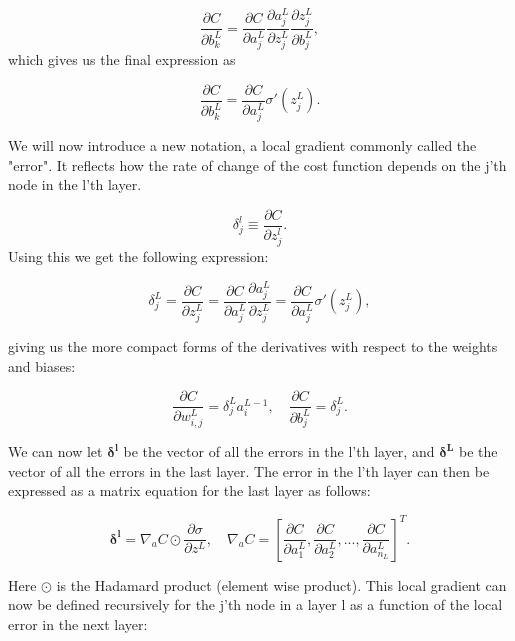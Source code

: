 \begin{equation*}
    \frac{\partial C}{\partial b_k^L} = \frac{\partial C}{\partial a_j^L}\frac{\partial a_j^L}{\partial z_j^L}\frac{\partial z_j^L}{\partial b_{j}^L},
\end{equation*}
which gives us the final expression as 

\begin{equation*}
    \frac{\partial C}{\partial b_k^L} = \frac{\partial C}{\partial a_j^L}\sigma'(z_j^L). 
\end{equation*}

We will now introduce a new notation, a local gradient commonly called the "error". It reflects how the rate of change of the cost function depends on the j'th node in the l'th layer.

\begin{equation*}
    \delta_j^l \equiv \frac{\partial C}{\partial z_j^l}.  
\end{equation*}
Using this we get the following expression:

\begin{equation*}
    \delta_j^L=  \frac{\partial C}{\partial z_j^L} = \frac{\partial C}{\partial a_j^L}\frac{\partial a_j^L}{\partial z_j^L} = \frac{\partial C}{\partial a_j^L}\sigma'(z_j^L),
\end{equation*}

giving us the more compact forms of the derivatives with respect to the weights and biases:

\begin{equation*}
    \frac{\partial C}{\partial w_{i,j}^L} = \delta_j^La_i^{L-1}, \quad \frac{\partial C}{\partial b_j^L} = \delta_j^L.
\end{equation*}

We can now let $\boldsymbol{\delta^l}$ be the vector of all the errors in the l'th layer, and $\boldsymbol{\delta^L}$ be the vector of all the errors in the last layer. 
The error in the l'th layer can then be expressed as a matrix equation for the last layer as follows:

\begin{equation*}
    \boldsymbol{\delta^l} = \nabla_aC \odot \frac{\partial \sigma}{\partial z^L}, \quad \nabla_aC = \left[\frac{\partial C}{\partial a_1^L}, \frac{\partial C}{\partial a_2^L}, ..., \frac{\partial C}{\partial a_{n_L}^L} \right]^T.
\end{equation*}

Here $\odot$ is the Hadamard product (element wise product). This local gradient can now be defined recursively for the j'th node in a layer l as a function of the local error in the next layer:

